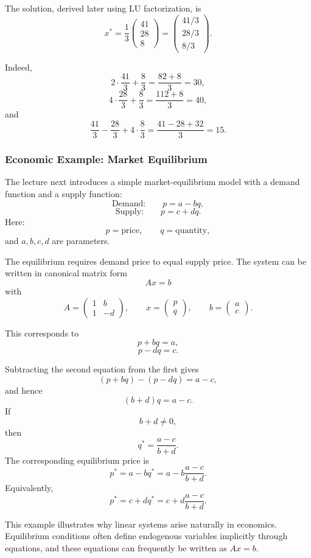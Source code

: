 \documentclass[10pt, letterpaper]{article}
\begin{document}
The solution, derived later using LU factorization, is
\[
x^\ast
=
\frac{1}{3}
\begin{pmatrix}
41\\
28\\
8
\end{pmatrix}
=
\begin{pmatrix}
41/3\\
28/3\\
8/3
\end{pmatrix}.
\]

Indeed,
\[
2\cdot \frac{41}{3}+\frac{8}{3}
=
\frac{82+8}{3}
=
30,
\]
\[
4\cdot \frac{28}{3}+\frac{8}{3}
=
\frac{112+8}{3}
=
40,
\]
and
\[
\frac{41}{3}-\frac{28}{3}+4\cdot \frac{8}{3}
=
\frac{41-28+32}{3}
=
15.
\]

\subsubsection{Economic Example: Market Equilibrium}

The lecture next introduces a simple market-equilibrium model with a demand function and a supply function:
\[
\text{Demand:}\qquad p=a-bq,
\]
\[
\text{Supply:}\qquad p=c+dq.
\]
Here:
\[
p=\text{price},\qquad q=\text{quantity},
\]
and \(a,b,c,d\) are parameters.

The equilibrium requires demand price to equal supply price. The system can be written in canonical matrix form
\[
Ax=b
\]
with
\[
A=
\begin{pmatrix}
1 & b\\
1 & -d
\end{pmatrix},
\qquad
x=
\begin{pmatrix}
p\\
q
\end{pmatrix},
\qquad
b=
\begin{pmatrix}
a\\
c
\end{pmatrix}.
\]

This corresponds to
\[
p+bq=a,
\]
\[
p-dq=c.
\]

Subtracting the second equation from the first gives
\[
(p+bq)-(p-dq)=a-c,
\]
and hence
\[
(b+d)q=a-c.
\]
If
\[
b+d\neq 0,
\]
then
\[
q^\ast=\frac{a-c}{b+d}.
\]
The corresponding equilibrium price is
\[
p^\ast=a-bq^\ast
=
a-b\frac{a-c}{b+d}.
\]
Equivalently,
\[
p^\ast=c+dq^\ast
=
c+d\frac{a-c}{b+d}.
\]

This example illustrates why linear systems arise naturally in economics. Equilibrium conditions often define endogenous variables implicitly through equations, and these equations can frequently be written as \(Ax=b\).
\end{document}
